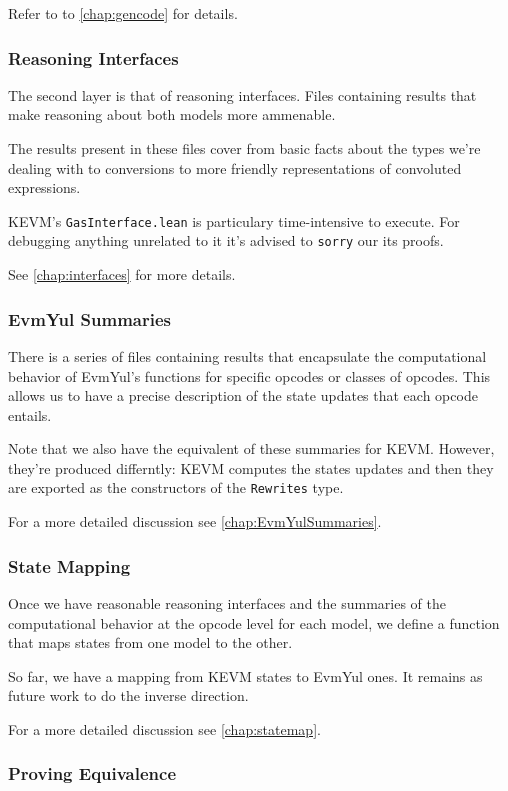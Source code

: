 Refer to to \ref{chap:gencode} for details.

\subsubsection*{Reasoning Interfaces}

The second layer is that of reasoning interfaces. Files containing results that
make reasoning about both models more ammenable.

The results present in these files cover from basic facts about the types we're
dealing with to conversions to more friendly representations of convoluted
expressions.

KEVM's \texttt{GasInterface.lean} is particulary time-intensive to execute. For
debugging anything unrelated to it it's advised to \texttt{sorry} our its
proofs.

See \ref{chap:interfaces} for more details.

\subsubsection*{EvmYul Summaries}

There is a series of files containing results that encapsulate the computational
behavior of EvmYul's functions for specific opcodes or classes of opcodes. This
allows us to have a precise description of the state updates that each opcode
entails.

Note that we also have the equivalent of these summaries for KEVM. However,
they're produced differntly: KEVM computes the states updates and then they are
exported as the constructors of the \texttt{Rewrites} type.

For a more detailed discussion see \ref{chap:EvmYulSummaries}.

\subsubsection*{State Mapping}

Once we have reasonable reasoning interfaces and the summaries of the
computational behavior at the opcode level for each model, we define a function
that maps states from one model to the other.

So far, we have a mapping from KEVM states to EvmYul ones. It remains as future
work to do the inverse direction.

For a more detailed discussion see \ref{chap:statemap}.

\subsubsection*{Proving Equivalence}

